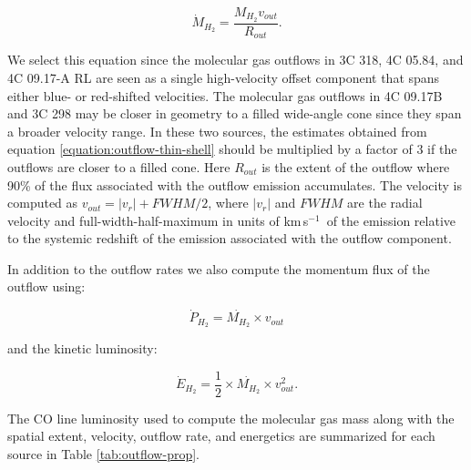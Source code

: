\documentclass[twocolumn]{aastex63}
\newcommand{\kms}{km\,s$^{-1}$}
\begin{document}
\begin{equation}\label{equation:outflow-thin-shell}
    \dot{M}_{H_{2}}=\frac{M_{H_{2}}v_{out}}{R_{out}}.
\end{equation}

We select this equation since the molecular gas outflows in 3C 318, 4C 05.84, and 4C 09.17-A RL are seen as a single high-velocity offset component that spans either blue- or red-shifted velocities. The molecular gas outflows in 4C 09.17B and 3C 298 may be closer in geometry to a filled wide-angle cone since they span a broader velocity range. In these two sources, the estimates obtained from equation \ref{equation:outflow-thin-shell} should be multiplied by a factor of 3 if the outflows are closer to a filled cone. Here $R_{out}$ is the extent of the outflow where 90\% of the flux associated with the outflow emission accumulates. The velocity is computed as $v_{out} = \left | v_{r} \right |  + FWHM/2$, where $\left | v_{r} \right |$ and $FWHM$  are the radial velocity and full-width-half-maximum in units of \kms\ of the emission relative to the systemic redshift of the emission associated with the outflow component.

In addition to the outflow rates we also compute the momentum flux of the outflow using: 

\begin{equation}
    \dot{P}_{H_{2}} = \dot{M_{H_{2}}} \times v_{out}
\end{equation}

\noindent and the kinetic luminosity:

\begin{equation}
    \dot{E}_{H_{2}} = \frac{1}{2}\times\dot{M_{H_{2}}}\times v_{out}^{2}.
\end{equation}

The CO line luminosity used to compute the molecular gas mass along with the spatial extent, velocity, outflow rate, and energetics are summarized for each source in Table \ref{tab:outflow-prop}.
\end{document}
